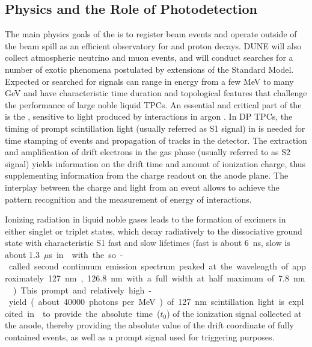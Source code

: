 \subsection{Physics and the Role of Photodetection}
\label{sec:fddp-pd-1.2}

The main physics goals of the  is to register beam events %
and operate outside of the beam spill as an efficient observatory for  and proton decays. DUNE will also collect atmospheric neutrino and muon events, and will conduct searches for a number of exotic phenomena postulated by extensions of the Standard Model.  Expected or searched for signals can range in energy from a few \si{MeV} to many \si{GeV} and have characteristic time duration and topological features that challenge the performance of large noble liquid TPCs. An essential and critical part of the \lartpc is the , sensitive to light produced by interactions in argon \cite{Cuesta:2017nrs}. In DP TPCs, the timing of prompt scintillation light (usually referred as S1 signal) in \lar is needed for time stamping of events and propagation of tracks in the detector. The extraction and amplification of drift electrons in the gas phase (usually referred to as S2 signal) yields information on the drift time and amount of ionization charge, thus supplementing information from the charge readout on the anode plane. The interplay between the charge and light from an event allows to achieve the pattern recognition and the measurement of energy of interactions.

Ionizing radiation in liquid noble gases leads to the formation of excimers in either singlet or triplet states, which decay radiatively to the dissociative ground state with characteristic S1 fast and slow lifetimes (fast is about \SI{6}{ns}, slow is about \SI{1.3}{$\mu$s} in \lar with the so-called second continuum emission spectrum peaked at the wavelength of approximately \SI{127}{nm}, \SI{126.8}{nm} with a full width at half maximum of \SI{7.8}{nm} \cite{Heindl}). This prompt and relatively high-yield (about \num{40000} photons per \si{MeV}) of \SI{127}{nm} scintillation light is exploited in \lartpc to provide the absolute time ($t_0$) of the ionization signal collected at the anode, thereby providing the absolute value of the drift coordinate of fully contained events, as well as a prompt signal used for triggering purposes.


